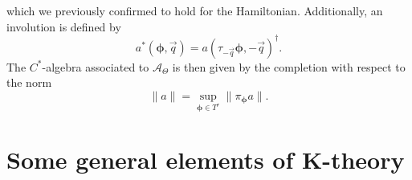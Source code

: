 \documentclass[
    10pt,
    aps,
    prb,
	longbibliography,
    twocolumn,
    floatfix,
    superscriptaddress,
]{revtex4-2}
\begin{document}
which we previously confirmed to hold for the Hamiltonian.
Additionally, an involution is defined by
\begin{equation}
	a^\ast( \boldsymbol{\phi}, \vec{q})
	= a( \tau_{-\vec{q}} \boldsymbol{\phi}, -\vec{q})^\dagger .
\end{equation}
The $C^\ast$-algebra associated to $\mathcal{A}_{\Theta}$ is then given by the completion with respect to the norm 
\begin{equation}
	\| a \| = \sup\limits_{ \boldsymbol{\phi} \in T^r} \| \pi_{\boldsymbol{\phi}} a \| .
\end{equation}

\section{Some general elements of K-theory}
\label{app:k_theory}
\end{document}

